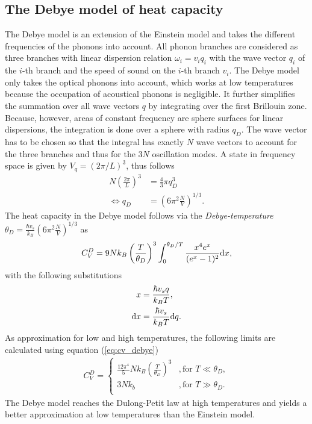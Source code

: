 \subsection{The Debye model of heat capacity}
\label{sec:debye}

The Debye model is an extension of the Einstein model and takes the different frequencies of the phonons into account.
All phonon branches are considered as three branches with linear dispersion relation $\omega_i = v_i q_i$ with the wave vector $q_i$ of the $i$-th branch and the speed of sound on the $i$-th branch $v_i$.
The Debye model only takes the optical phonons into account, which works at low temperatures because the occupation of acoustical phonons is negligible.
It further simplifies the summation over all wave vectors $q$ by integrating over the first Brillouin zone.
Because, however, areas of constant frequency are sphere surfaces for linear dispersions, the integration is done over a sphere with radius $q_D$.
The wave vector has to be chosen so that the integral has exactly $N$ wave vectors to account for the three branches and thus for the $3N$ oscillation modes.
A state in frequency space is given by $V_q = (2\pi/L)^3$, thus follows
\begin{align}
    N\left(\frac{2\pi}{L}\right)^3 &= \frac 43\pi q_D^3 \\
    \iff q_D &= \left(6\pi^2\frac NV\right)^{1/3}.
    \label{eq:q_D}
\end{align}
The heat capacity in the Debye model follows via the \textit{Debye-temperature} $\theta_D=\frac{\hbar v_s}{k_B}\left(6\pi^2\frac NV\right)^{1/3}$ as
\begin{align}
    C_V^D=9Nk_B\left(\frac{T}{\theta_D}\right)^3\int_0^{\theta_D/T}\frac{x^4e^x}{(e^x-1)^2}\text dx,
    \label{eq:cv_debye}
\end{align}
with the following substitutions
\begin{align}
    \label{eq:substitution_x}
    x &= \frac{\hbar v_s q}{k_BT}, \\
    \text dx &= \frac{\hbar v_s}{k_BT}\text dq.
    \label{eq:substitution_dx}
\end{align}
As approximation for low and high temperatures, the following limits are calculated using equation (\ref{eq:cv_debye})
\begin{align}
    C_V^D=\begin{cases}
        \frac{12\pi^4}{5}Nk_B\left(\frac{T}{\theta_D} \right)^3 &,\text{for }T\ll\theta_D, \\
        3Nk_b &,\text{for }T\gg\theta_D. \\
        \end{cases}
    \label{eq:cv_debye_final}
\end{align}
The Debye model reaches the Dulong-Petit law at high temperatures and yields a better approximation at low temperatures than the Einstein model.